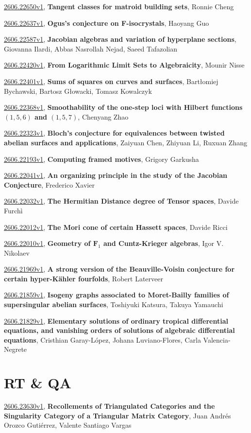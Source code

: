 \documentclass[9pt, a4paper]{article}
\theoremstyle{plain}
\theoremstyle{definition}
\theoremstyle{remark}
\newcommand{\arxiv}[3]{\href{https://arxiv.org/abs/#1}{#1}, \textbf{\textcolor{arxivblue}{#2}}, #3}
\begin{document}
\arxiv{2606.22650v1}{Tangent classes for matroid building sets}{Ronnie Cheng}

\arxiv{2606.22637v1}{Ogus's conjecture on F-isocrystals}{Haoyang Guo}

\arxiv{2606.22587v1}{Jacobian algebras and variation of hyperplane sections}{Giovanna Ilardi, Abbas Nasrollah Nejad, Saeed Tafazolian}

\arxiv{2606.22420v1}{From Logarithmic Limit Sets to Algebraicity}{Mounir Nisse}

\arxiv{2606.22401v1}{Sums of squares on curves and surfaces}{Bartłomiej Bychawski, Bartosz Głowacki, Tomasz Kowalczyk}

\arxiv{2606.22368v1}{Smoothability of the one-step loci with Hilbert functions $(1,5,6)$ and $(1,5,7)$}{Chenyang Zhao}

\arxiv{2606.22323v1}{Bloch's conjecture for equivalences between twisted abelian surfaces and applications}{Zaiyuan Chen, Zhiyuan Li, Ruxuan Zhang}

\arxiv{2606.22193v1}{Computing framed motives}{Grigory Garkusha}

\arxiv{2606.22041v1}{An organizing principle in the study of the Jacobian Conjecture}{Frederico Xavier}

\arxiv{2606.22032v1}{The Hermitian Distance degree of Tensor spaces}{Davide Furchì}

\arxiv{2606.22012v1}{The Mori cone of certain Hassett spaces}{Davide Ricci}

\arxiv{2606.22010v1}{Geometry of $\mathbf{F}_1$ and Cuntz-Krieger algebras}{Igor V. Nikolaev}

\arxiv{2606.21969v1}{A strong version of the Beauville-Voisin conjecture for certain hyper-Kähler fourfolds}{Robert Laterveer}

\arxiv{2606.21859v1}{Isogeny graphs associated to Moret-Bailly families of supersingular abelian surfaces}{Toshiyuki Katsura, Takuya Yamauchi}

\arxiv{2606.21829v1}{Elementary solutions of ordinary tropical differential equations, and vanishing orders of solutions of algebraic differential equations}{Cristhian Garay-López, Johana Luviano-Flores, Carla Valencia-Negrete}


\section{RT \& QA}
\arxiv{2606.23630v1}{Recollements of Triangulated Categories and the Singularity Category of a Triangular Matrix Category}{Juan Andrés Orozco Gutiérrez, Valente Santiago Vargas}
\end{document}
